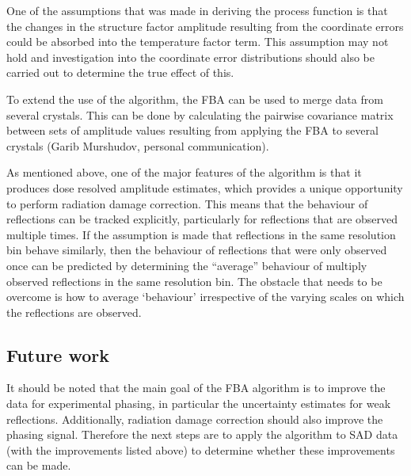 One of the assumptions that was made in deriving the process function is that the changes in the structure factor amplitude resulting from the coordinate errors could be absorbed into the temperature factor term.
This assumption may not hold and investigation into the coordinate error distributions should also be carried out to determine the true effect of this.

To extend the use of the algorithm, the FBA can be used to merge data from several crystals.
This can be done by calculating the pairwise covariance matrix between sets of amplitude values resulting from applying the FBA to several crystals (Garib Murshudov, personal communication).

As mentioned above, one of the major features of the algorithm is that it produces dose resolved amplitude estimates, which provides a unique opportunity to perform radiation damage correction.
This means that the behaviour of reflections can be tracked explicitly, particularly for reflections that are observed multiple times.
If the assumption is made that reflections in the same resolution bin behave similarly, then the behaviour of reflections that were only observed once can be predicted by determining the ``average'' behaviour of multiply observed reflections in the same resolution bin.
The obstacle that needs to be overcome is how to average `behaviour' irrespective of the varying scales on which the reflections are observed.

\subsection{Future work}
\label{sub:Future work}
It should be noted that the main goal of the FBA algorithm is to improve the data for experimental phasing, in particular the uncertainty estimates for weak reflections.
Additionally, radiation damage correction should also improve the phasing signal.
Therefore the next steps are to apply the algorithm to SAD data (with the improvements listed above) to determine whether these improvements can be made.
